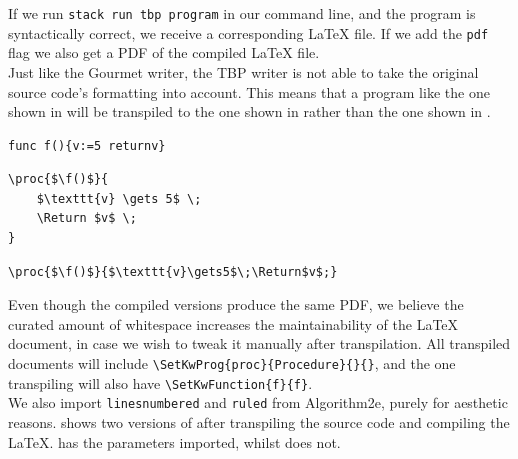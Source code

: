 If we run \texttt{stack run tbp program} in our command line, and the program is syntactically correct, we receive a corresponding LaTeX file. If we add the \texttt{pdf} flag we also get a PDF of the compiled LaTeX file. \\

Just like the Gourmet writer, the TBP writer is not able to take the original source code's formatting into account. This means that a program like the one shown in  will be transpiled to the one shown in  rather than the one shown in . \\

\begin{lstlisting}[caption={A Gourmet function which declares a variable and returns it.}, captionpos=b, label={Gourmet f}]
func f(){v:=5 returnv}
\end{lstlisting}

\begin{lstlisting}[caption={How Psnodig transpiles the program from \Cref{Gourmet f}.}, captionpos=b, label={How Psnodig transpiles the program from}]
\proc{$\f()$}{
    $\texttt{v} \gets 5$ \;
    \Return $v$ \;
}
\end{lstlisting}

\begin{lstlisting}[caption={Alternative version of f in LaTeX with Algorithm2e.}, captionpos=b, label={Alternative version of f in LaTeX with Algorithm2e.}]
\proc{$\f()$}{$\texttt{v}\gets5$\;\Return$v$;}
\end{lstlisting}

Even though the compiled versions produce the same PDF, we believe the curated amount of whitespace increases the maintainability of the LaTeX document, in case we wish to tweak it manually after transpilation. All transpiled documents will include \texttt{\textbackslash SetKwProg\{proc\}\{Procedure\}\{\}\{\}}, and the one transpiling  will also have \texttt{\textbackslash SetKwFunction\{f\}\{f\}}. \\

We also import \texttt{linesnumbered} and \texttt{ruled} from Algorithm2e, purely for aesthetic reasons.  shows two versions of  after transpiling the source code and compiling the LaTeX.  has the parameters imported, whilst  does not. \\

